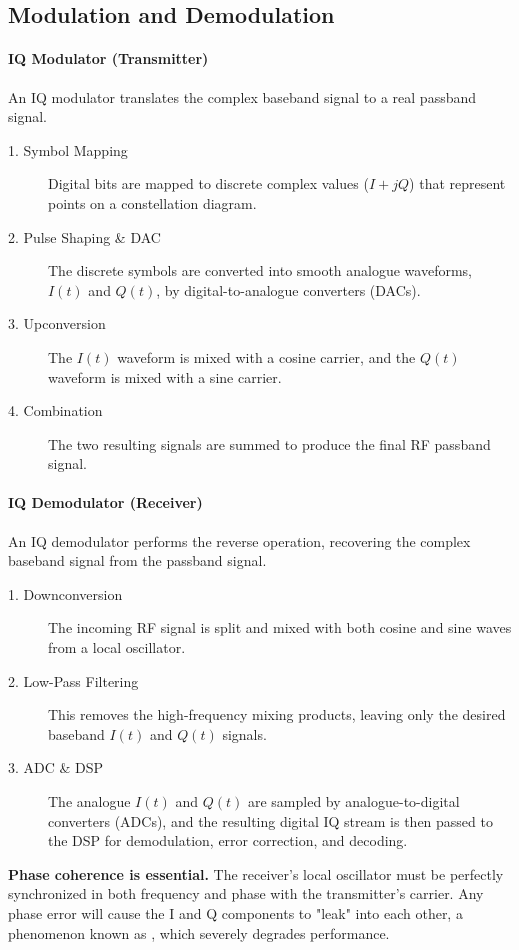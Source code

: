 \subsection{Modulation and Demodulation}

\paragraph{IQ Modulator (Transmitter)}
An IQ modulator translates the complex baseband signal to a real passband signal.
\begin{description}
    \item[1. Symbol Mapping] Digital bits are mapped to discrete complex values ($I+jQ$) that represent points on a constellation diagram.
    \item[2. Pulse Shaping & DAC] The discrete symbols are converted into smooth analogue waveforms, $I(t)$ and $Q(t)$, by digital-to-analogue converters (DACs).
    \item[3. Upconversion] The $I(t)$ waveform is mixed with a cosine carrier, and the $Q(t)$ waveform is mixed with a sine carrier.
    \item[4. Combination] The two resulting signals are summed to produce the final RF passband signal.
\end{description}

\paragraph{IQ Demodulator (Receiver)}
An IQ demodulator performs the reverse operation, recovering the complex baseband signal from the passband signal.
\begin{description}
    \item[1. Downconversion] The incoming RF signal is split and mixed with both cosine and sine waves from a local oscillator.
    \item[2. Low-Pass Filtering] This removes the high-frequency mixing products, leaving only the desired baseband $I(t)$ and $Q(t)$ signals.
    \item[3. ADC & DSP] The analogue $I(t)$ and $Q(t)$ are sampled by analogue-to-digital converters (ADCs), and the resulting digital IQ stream is then passed to the DSP for demodulation, error correction, and decoding.
\end{description}

\begin{warningbox}
    \textbf{Phase coherence is essential.} The receiver's local oscillator must be perfectly synchronized in both frequency and phase with the transmitter's carrier. Any phase error will cause the I and Q components to "leak" into each other, a phenomenon known as , which severely degrades performance.
\end{warningbox}

